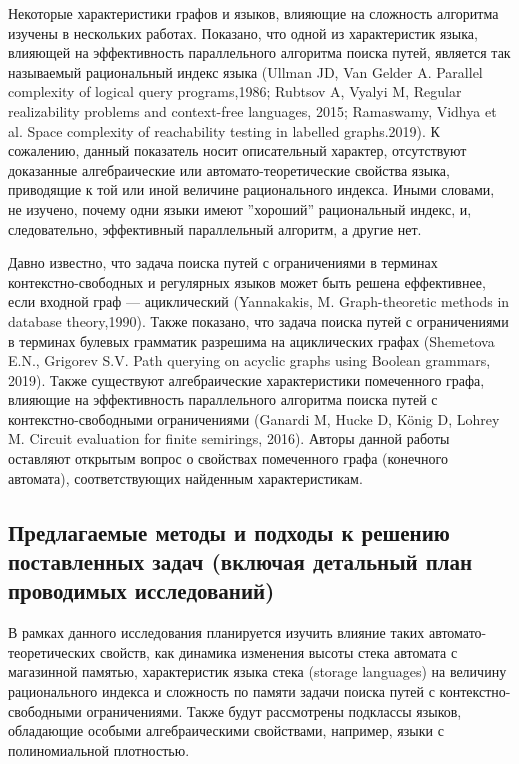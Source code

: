 \documentclass[12pt]{article}  %
\theoremstyle{remark}
\begin{document}
Некоторые характеристики графов и языков, влияющие на сложность алгоритма изучены в нескольких работах. Показано, что одной из характеристик языка, влияющей на эффективность параллельного алгоритма поиска путей, является так называемый рациональный индекс языка (Ullman JD, Van Gelder A. Parallel complexity of logical query programs,1986; Rubtsov A, Vyalyi M, Regular realizability problems and context-free languages, 2015; Ramaswamy, Vidhya et al. Space complexity of reachability testing in labelled graphs.2019). К сожалению, данный показатель носит описательный характер, отсутствуют доказанные алгебраические или автомато-теоретические свойства языка, приводящие к той или иной величине рационального индекса. Иными словами, не изучено, почему одни языки имеют ''хороший'' рациональный индекс, и, следовательно, эффективный параллельный алгоритм, а другие нет.


Давно известно, что задача поиска путей с ограничениями в терминах контекстно-свободных и регулярных языков может быть решена еффективнее, если входной граф --- ациклический (Yannakakis, M. Graph-theoretic methods in database theory,1990). Также показано, что задача поиска путей с ограничениями в терминах булевых грамматик разрешима на ациклических графах (Shemetova E.N., Grigorev S.V. Path querying on acyclic graphs using Boolean grammars, 2019). Также существуют алгебраические характеристики помеченного графа, влияющие на эффективность параллельного алгоритма поиска путей с контекстно-свободными ограничениями (Ganardi M, Hucke D, König D, Lohrey M. Circuit evaluation for finite semirings, 2016). Авторы данной работы оставляют открытым вопрос о свойствах помеченного графа (конечного автомата), соответствующих найденным характеристикам.


\subsection{Предлагаемые методы и подходы к решению поставленных задач (включая детальный план проводимых исследований)}

В рамках данного исследования планируется изучить влияние таких автомато-теоретических свойств, как динамика изменения высоты стека автомата с магазинной памятью,  характеристик языка стека (storage languages) на величину рационального индекса и сложность по памяти задачи поиска путей с контекстно-свободными ограничениями. Также будут рассмотрены подклассы языков, обладающие особыми алгебраическими свойствами, например, языки с полиномиальной плотностью.
\end{document}
